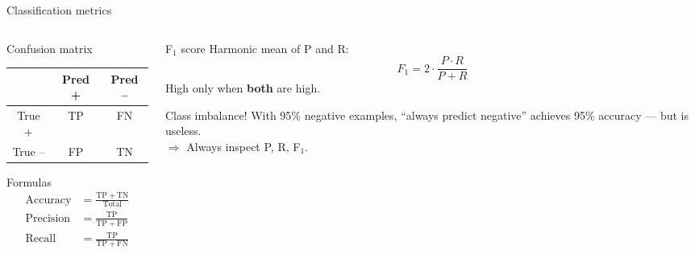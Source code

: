 \documentclass[11pt,aspectratio=169]{beamer}
\begin{document}
\begin{frame}{Classification metrics}
\begin{columns}[T]
\begin{column}{0.5\textwidth}
\begin{block}{Confusion matrix}
\begin{tabular}{|c|cc|}
\hline
& Pred + & Pred -- \\
\hline
True + & TP & FN \\
True -- & FP & TN \\
\hline
\end{tabular}
\end{block}
\begin{block}{Formulas}
\begin{align*}
\mathrm{Accuracy} &= \frac{\mathrm{TP} + \mathrm{TN}}{\mathrm{Total}} \\
\mathrm{Precision} &= \frac{\mathrm{TP}}{\mathrm{TP} + \mathrm{FP}} \\
\mathrm{Recall} &= \frac{\mathrm{TP}}{\mathrm{TP} + \mathrm{FN}}
\end{align*}
\end{block}
\end{column}
\begin{column}{0.5\textwidth}
\begin{block}{F$_1$ score}
Harmonic mean of P and R:
\[ F_1 = 2 \cdot \frac{P \cdot R}{P + R} \]
High only when \textbf{both} are high.
\end{block}
\begin{alertblock}{Class imbalance!}
With 95\% negative examples, ``always predict negative'' achieves 95\% accuracy --- but is useless.\\
$\Rightarrow$ Always inspect P, R, F$_1$.
\end{alertblock}
\end{column}
\end{columns}
\end{frame}
\end{document}

